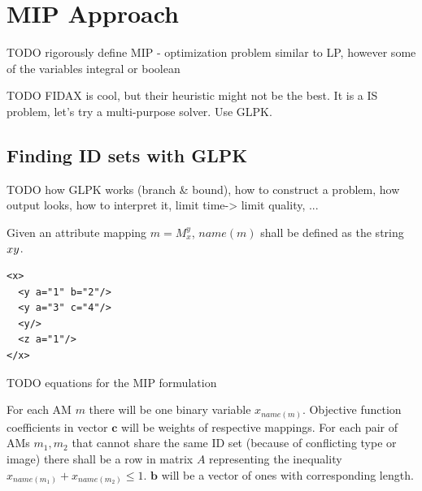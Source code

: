 \chapter{MIP Approach}
\label{chapter-mip}

TODO rigorously define MIP - optimization problem similar to LP, however some of the variables integral or boolean

TODO FIDAX is cool, but their heuristic might not be the best. It is a IS problem, let's try a multi-purpose solver. Use GLPK. 

\section{Finding ID sets with GLPK}

TODO how GLPK works (branch \& bound), how to construct a problem, how output looks, how to interpret it, limit time-> limit quality, ...

\begin{define}[$name()$]
Given an attribute mapping $m = M_{x}^{y}$, $name(m)$ shall be defined as the string $x\-y$.
\end{define}

\begin{verbatim}
<x>
  <y a="1" b="2"/>
  <y a="3" c="4"/>
  <y/>
  <z a="1"/>
</x>
\end{verbatim}

TODO equations for the MIP formulation

For each AM $m$ there will be one binary variable $x_{name(m)}$. Objective function coefficients in vector $\mathbf{c}$ will be weights of respective mappings. For each pair of AMs $m_1, m_2$ that cannot share the same ID set (because of conflicting type or image) there shall be a row in matrix $A$ representing the inequality $x_{name(m_1)} + x_{name(m_2)} \leqslant 1$. $\mathbf{b}$ will be a vector of ones with corresponding length.

